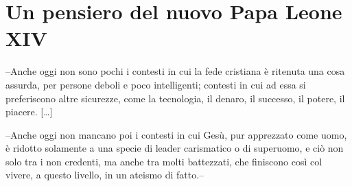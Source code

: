 \section{Un pensiero del nuovo Papa Leone XIV}


--Anche oggi non sono pochi i contesti in cui la fede cristiana è ritenuta una cosa assurda, per persone deboli e poco intelligenti; contesti in cui ad essa si preferiscono altre sicurezze, come la tecnologia, il denaro, il successo, il potere, il piacere. [\dots]

--Anche oggi non mancano poi i contesti in cui Gesù, pur apprezzato come uomo, è ridotto solamente a una specie di leader carismatico o di superuomo, e ciò non solo tra i non credenti, ma anche tra molti battezzati, che finiscono così col vivere, a questo livello, in un ateismo di fatto.--




